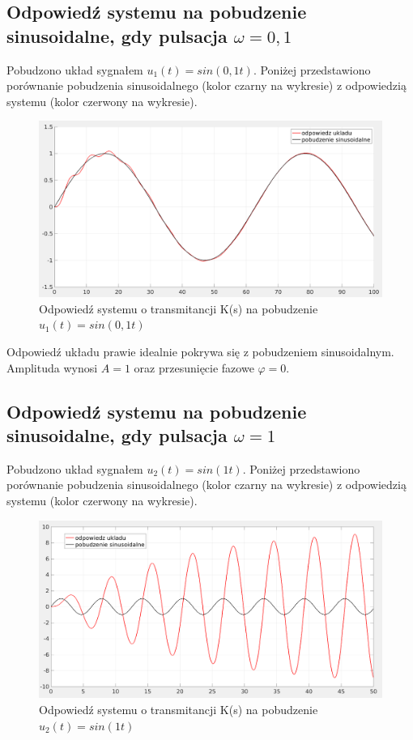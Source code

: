 \documentclass[12pt]{article}
\begin{document}
\subsection{Odpowiedź systemu na pobudzenie sinusoidalne, gdy pulsacja $\omega = 0,1$}
Pobudzono układ sygnałem $u_1(t)=sin(0,1 t)$. Poniżej przedstawiono porównanie pobudzenia sinusoidalnego (kolor czarny na wykresie) z odpowiedzią systemu (kolor czerwony na wykresie).
\begin{figure}[H]
    \centering
    \includegraphics[scale=0.2]{2.1.png}
    \caption{Odpowiedź systemu o transmitancji K(s) na pobudzenie $u_1(t)=sin(0,1 t)$}
\end{figure}

Odpowiedź układu prawie idealnie pokrywa się z pobudzeniem sinusoidalnym. Amplituda wynosi $A=1$ oraz przesunięcie fazowe $ \varphi=0$.

\subsection{Odpowiedź systemu na pobudzenie sinusoidalne, gdy pulsacja $\omega = 1$}
Pobudzono układ sygnałem $u_2(t)=sin(1 t)$. Poniżej przedstawiono porównanie pobudzenia sinusoidalnego (kolor czarny na wykresie) z odpowiedzią systemu (kolor czerwony na wykresie).
\begin{figure}[H]
    \centering
    \includegraphics[scale=0.2]{2.2.png}
    \caption{Odpowiedź systemu o transmitancji K(s) na pobudzenie $u_2(t)=sin(1 t)$}
    \label{fig:2}
\end{figure}
\end{document}
